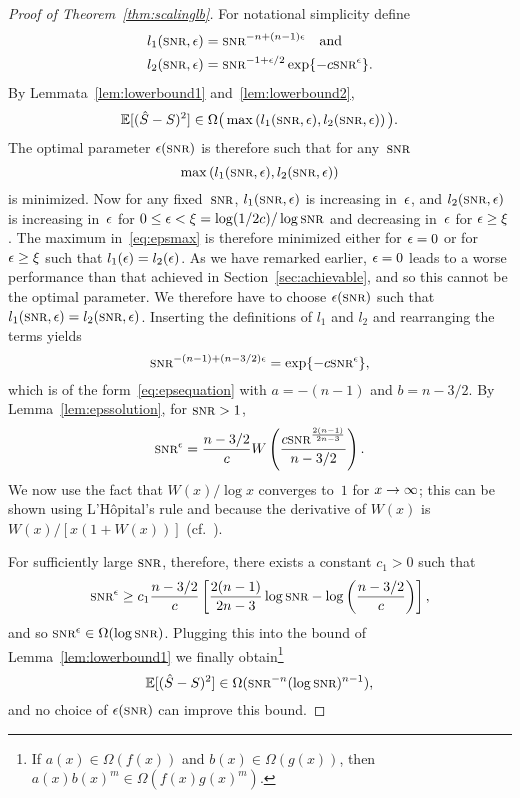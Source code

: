 %
\begin{proof}[Proof of Theorem~\ref{thm:scalinglb}]
  For notational simplicity define
  \begin{align*}
    l_1(\snr, \e) &= \snr^{-n+(n-1)\e} \quad\text{and} \\
    l_2(\snr,\e) &= \snr^{-1+\e/2} \exp\{-c\snr^\e\}.
  \end{align*}
  By Lemmata~\ref{lem:lowerbound1} and~\ref{lem:lowerbound2},
  \begin{equation*}
    \mse \in \Omega\big(\max \left( l_1(\snr,\e), l_2(\snr,\e) \right) \big).
  \end{equation*}
  The optimal parameter $\e(\snr)$ is therefore such that for
  any~$\snr$
  \begin{equation}
    \label{eq:epsmax}
    \max\left( l_1(\snr,\e), l_2(\snr,\e) \right)
  \end{equation}
  is minimized. Now for any fixed~$\snr$, $l_1(\snr,\e)$ is increasing in~$\epsilon$,
  and $l_2(\snr,\e)$ is increasing in~$\epsilon$ for $0 \le \e < \xi =
  \log(1/2c)/\log\snr$ and decreasing in~$\epsilon$ for $\epsilon \ge \xi$.  The maximum
  in~\eqref{eq:epsmax} is therefore minimized either for $\epsilon = 0$ or for $\epsilon \ge
  \xi$ such that $l_1(\epsilon) = l_2(\epsilon)$. As we have remarked earlier, $\epsilon = 0$
  leads to a worse performance than that achieved in
  Section~\ref{sec:achievable}, and so this cannot be the optimal parameter. We
  therefore have to choose $\e(\snr)$ such that $l_1(\snr,\e) = l_2(\snr, \e)$.
  Inserting the definitions of $l_1$ and $l_2$ and rearranging the terms yields
  \begin{equation*}
    \snr^{-(n-1) + (n-3/2)\e} = \exp\{-c\snr^\e\},
  \end{equation*}
  which is of the form~\eqref{eq:epsequation} with $a = -(n-1)$ and $b = n-3/2$.
  By Lemma~\ref{lem:epssolution}, for $\snr > 1$,
  \begin{equation*}
    \snr^\e = \frac{n-3/2}{c}
    W\left( \frac{c\snr^{\frac{2(n-1)}{2n-3}}}{n-3/2} \right).
  \end{equation*}
  We now use the fact that $W(x)/\log x$ converges to~$1$ for $x \rightarrow \infty$;
  this can be shown using L'H\^opital's rule and because the derivative of
  $W(x)$ is $W(x)/[x(1 + W(x))]$ (cf.~\cite{CorlessGHJK1996}).

  For sufficiently large $\snr$, therefore, there exists a constant $c_1 > 0$
  such that
  \begin{equation*}
    \snr^\e \ge c_1 \frac{n-3/2}{c} \left[ \frac{2(n-1)}{2n-3}\log\snr -
    \log\left(\frac{n-3/2}{c}\right)
    \right],
  \end{equation*}
  and so $\snr^\e \in \Omega(\log\snr)$. Plugging this into the bound of
  Lemma~\ref{lem:lowerbound1} we finally obtain\footnote{If $a(x) \in
  \Omega(f(x))$ and $b(x) \in \Omega(g(x))$, then $a(x)b(x)^m \in
  \Omega(f(x)g(x)^m)$.}
  \begin{equation*}
    \mse \in \Omega(\snr^{-n}(\log\snr)^{n-1}),
  \end{equation*}
  and no choice of $\e(\snr)$ can improve this bound.
\end{proof}


